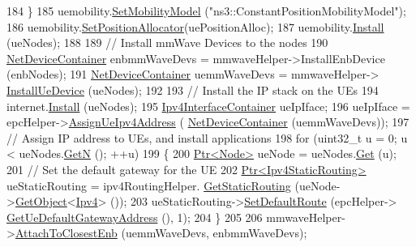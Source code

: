 \begin{DoxyCode}
184         \}
185         uemobility.\hyperlink{classns3_1_1MobilityHelper_a030275011b6f40682e70534d30280aba}{SetMobilityModel} (\textcolor{stringliteral}{"ns3::ConstantPositionMobilityModel"});
186         uemobility.\hyperlink{classns3_1_1MobilityHelper_ac59d5295076be3cc11021566713a28c5}{SetPositionAllocator}(uePositionAlloc);
187         uemobility.\hyperlink{classns3_1_1MobilityHelper_a07737960ee95c0777109cf2994dd97ae}{Install} (ueNodes);
188 
189         \textcolor{comment}{// Install mmWave Devices to the nodes}
190         \hyperlink{classns3_1_1NetDeviceContainer}{NetDeviceContainer} enbmmWaveDevs = mmwaveHelper->InstallEnbDevice (enbNodes);
191         \hyperlink{classns3_1_1NetDeviceContainer}{NetDeviceContainer} uemmWaveDevs = mmwaveHelper->
      \hyperlink{classns3_1_1MmWaveHelper_a9311c819d7ee539c8710c5b7e98df37a}{InstallUeDevice} (ueNodes);
192 
193         \textcolor{comment}{// Install the IP stack on the UEs}
194         internet.\hyperlink{classns3_1_1InternetStackHelper_a6645b412f31283d2d9bc3d8a95cebbc0}{Install} (ueNodes);
195         \hyperlink{classns3_1_1Ipv4InterfaceContainer}{Ipv4InterfaceContainer} ueIpIface;
196         ueIpIface = epcHelper->\hyperlink{classns3_1_1MmWavePointToPointEpcHelper_ad96757d4c63d33f683dce1b5d6bca3b9}{AssignUeIpv4Address} (
      \hyperlink{classns3_1_1NetDeviceContainer}{NetDeviceContainer} (uemmWaveDevs));
197         \textcolor{comment}{// Assign IP address to UEs, and install applications}
198         \textcolor{keywordflow}{for} (uint32\_t u = 0; u < ueNodes.\hyperlink{classns3_1_1NodeContainer_aed647ac56d0407a7706aba02eb44b951}{GetN} (); ++u)
199         \{
200                 \hyperlink{classns3_1_1Ptr}{Ptr<Node>} ueNode = ueNodes.\hyperlink{classns3_1_1NodeContainer_a9ed96e2ecc22e0f5a3d4842eb9bf90bf}{Get} (u);
201                 \textcolor{comment}{// Set the default gateway for the UE}
202                 \hyperlink{classns3_1_1Ptr}{Ptr<Ipv4StaticRouting>} ueStaticRouting = ipv4RoutingHelper.
      \hyperlink{classns3_1_1Ipv4StaticRoutingHelper_a731206e50d305695dac7fb2ef963a4bb}{GetStaticRouting} (ueNode->\hyperlink{classns3_1_1Object_a13e18c00017096c8381eb651d5bd0783}{GetObject}<\hyperlink{classns3_1_1Ipv4}{Ipv4}> ());
203                 ueStaticRouting->\hyperlink{classns3_1_1Ipv4StaticRouting_aee30fa3246c2b42f122dabdff2725331}{SetDefaultRoute} (epcHelper->
      \hyperlink{classns3_1_1MmWavePointToPointEpcHelper_afefac14ad79ff059b052305013d2beb3}{GetUeDefaultGatewayAddress} (), 1);
204         \}
205 
206         mmwaveHelper->\hyperlink{classns3_1_1MmWaveHelper_a202baea67b0af0d4fb6069de73766dc6}{AttachToClosestEnb} (uemmWaveDevs, enbmmWaveDevs);

\end{DoxyCode}
